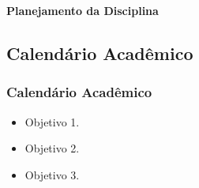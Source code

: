 {
  \begin{frame}[plain]%

    \vfill
    \centering

    \begin{block}{}
      \centering{}
      \Huge{\textbf{Planejamento da Disciplina}}
    \end{block}

    \vfill

  \end{frame}
} %



\subsection[Calendário Acadêmico]{Calendário Acadêmico}\label{subsec:planejamento-calendario-academico}



\begin{frame}[t]\frametitle{Calendário Acadêmico}

  \begin{itemize}
    \justifying{}
    \setlength\itemsep{1em}
    \item Objetivo 1.
    \item Objetivo 2.
    \item Objetivo 3.
  \end{itemize}

\end{frame}



